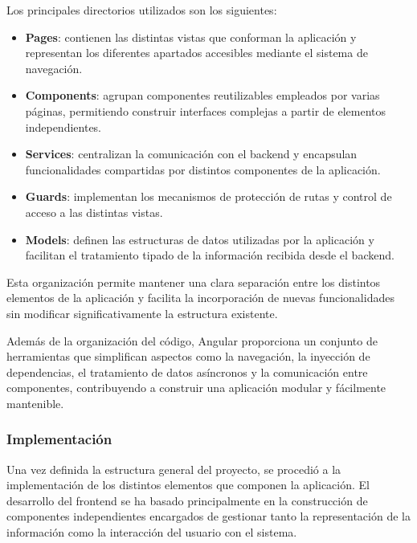 Los principales directorios utilizados son los siguientes:

\begin{itemize}
    \item \textbf{Pages}: contienen las distintas vistas que conforman la aplicación y representan los diferentes apartados accesibles mediante el sistema de navegación.

    \item \textbf{Components}: agrupan componentes reutilizables empleados por varias páginas, permitiendo construir interfaces complejas a partir de elementos independientes.

    \item \textbf{Services}: centralizan la comunicación con el backend y encapsulan funcionalidades compartidas por distintos componentes de la aplicación.

    \item \textbf{Guards}: implementan los mecanismos de protección de rutas y control de acceso a las distintas vistas.

    \item \textbf{Models}: definen las estructuras de datos utilizadas por la aplicación y facilitan el tratamiento tipado de la información recibida desde el backend.
\end{itemize}

Esta organización permite mantener una clara separación entre los distintos elementos de la aplicación y facilita la incorporación de nuevas funcionalidades sin modificar significativamente la estructura existente.

Además de la organización del código, Angular proporciona un conjunto de herramientas que simplifican aspectos como la navegación, la inyección de dependencias, el tratamiento de datos asíncronos y la comunicación entre componentes, contribuyendo a construir una aplicación modular y fácilmente mantenible.

\subsubsection{Implementación}

Una vez definida la estructura general del proyecto, se procedió a la implementación de los distintos elementos que componen la aplicación. El desarrollo del frontend se ha basado principalmente en la construcción de componentes independientes encargados de gestionar tanto la representación de la información como la interacción del usuario con el sistema.

